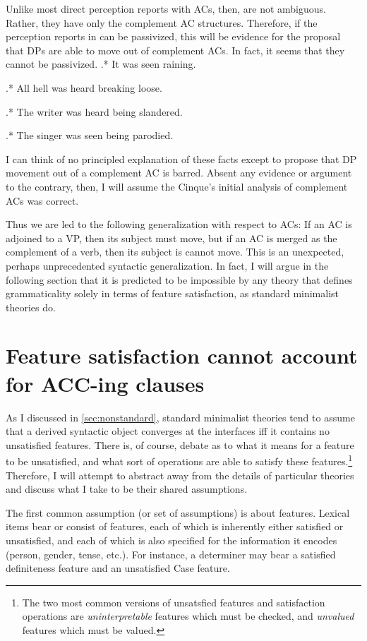 \documentclass[MilwayThesis]{subfiles}
\begin{document}
Unlike most direct perception reports with ACs, then,  are not ambiguous.
Rather, they have only the complement AC structures.
Therefore, if the perception reports in  can be passivized, this will be evidence for the proposal that DPs are able to move out of complement ACs.
In fact, it seems that they cannot be passivized.
\ex.* It was seen raining.

\ex.* All hell was heard breaking loose.

\ex.* The writer was heard being slandered.

\ex.* The singer was seen being parodied.

I can think of no principled explanation of these facts except to propose that DP movement out of a complement AC is barred.
Absent any evidence or argument to the contrary, then, I will assume the Cinque's initial analysis of complement ACs was correct.

Thus we are led to the following generalization with respect to ACs:
If an AC is adjoined to a VP, then its subject must move, but if an AC is merged as the complement of a verb, then its subject is cannot move.
This is an unexpected, perhaps unprecedented syntactic generalization.
In fact, I will argue in the following section that it is predicted to be impossible by any theory that defines grammaticality solely in terms of feature satisfaction, as standard minimalist theories do.
\section{Feature satisfaction cannot account for ACC-ing clauses}\label{sec:paradox}
As I discussed in \cref{sec:nonstandard}, standard minimalist theories tend to assume that a derived syntactic object converges at the interfaces iff it contains no unsatisfied features.
There is, of course, debate as to what it means for a feature to be unsatisfied, and what sort of operations are able to satisfy these features.\footnote{
	The two most common versions of unsatsfied features and satisfaction operations are \textit{uninterpretable} features which must be checked, and \textit{unvalued} features which must be valued.
}
Therefore, I will attempt to abstract away from the details of particular theories and discuss what I take to be their shared assumptions.

The first common assumption (or set of assumptions) is about features.
Lexical items bear or consist of features, each of which is inherently either satisfied or unsatisfied, and each of which is also specified for the information it encodes (person, gender, tense, etc.).
For instance, a determiner may bear a satisfied definiteness feature and an unsatisfied Case feature.
\end{document}
